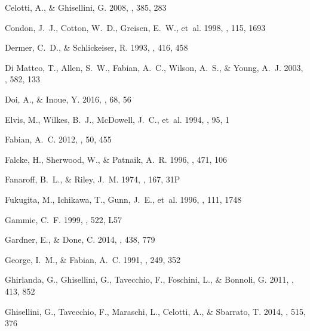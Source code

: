 \documentclass[preprint2,twocolappendix]{aastex6}
\begin{document}
\begin{thebibliography}{}
{Celotti}, A., \& {Ghisellini}, G. 2008, \mnras, 385, 283

{Condon}, J.~J., {Cotton}, W.~D., {Greisen}, E.~W., {et~al.} 1998, \aj, 115,
  1693

{Dermer}, C.~D., \& {Schlickeiser}, R. 1993, \apj, 416, 458

{Di Matteo}, T., {Allen}, S.~W., {Fabian}, A.~C., {Wilson}, A.~S., \& {Young},
  A.~J. 2003, \apj, 582, 133

{Doi}, A., \& {Inoue}, Y. 2016, \pasj, 68, 56

{Elvis}, M., {Wilkes}, B.~J., {McDowell}, J.~C., {et~al.} 1994, \apjs, 95, 1

{Fabian}, A.~C. 2012, \araa, 50, 455

{Falcke}, H., {Sherwood}, W., \& {Patnaik}, A.~R. 1996, \apj, 471, 106

{Fanaroff}, B.~L., \& {Riley}, J.~M. 1974, \mnras, 167, 31P

{Fukugita}, M., {Ichikawa}, T., {Gunn}, J.~E., {et~al.} 1996, \aj, 111, 1748

{Gammie}, C.~F. 1999, \apjl, 522, L57

{Gardner}, E., \& {Done}, C. 2014, \mnras, 438, 779

{George}, I.~M., \& {Fabian}, A.~C. 1991, \mnras, 249, 352

{Ghirlanda}, G., {Ghisellini}, G., {Tavecchio}, F., {Foschini}, L., \&
  {Bonnoli}, G. 2011, \mnras, 413, 852

{Ghisellini}, G., {Tavecchio}, F., {Maraschi}, L., {Celotti}, A., \&
  {Sbarrato}, T. 2014, \nat, 515, 376


\end{thebibliography}
\end{document}
